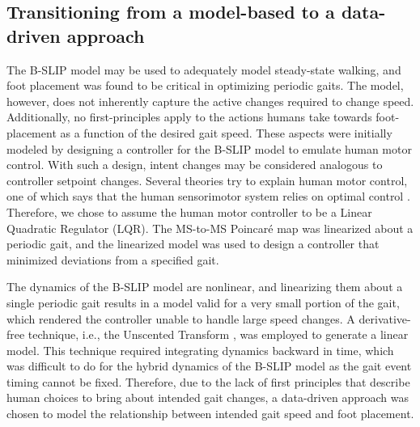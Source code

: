 \subsection{Transitioning from a model-based to a data-driven approach}
The B-SLIP model may be used to adequately model steady-state walking, and foot placement was found to be critical in optimizing periodic gaits. The model, however, does not inherently capture the active changes required to change speed. Additionally, no first-principles apply to the actions humans take towards foot-placement as a function of the desired gait speed. These aspects were initially modeled by designing a controller for the B-SLIP model to emulate human motor control. With such a design, intent changes may be considered analogous to controller setpoint changes. Several theories try to explain human motor control, one of which says that the human sensorimotor system relies on optimal control \cite{todorov2004optimality,sylla2014assessing}. Therefore, we chose to assume the human motor controller to be a Linear Quadratic Regulator (LQR). The MS-to-MS Poincar\'e map was linearized about a periodic gait, and the linearized model was used to design a controller that minimized deviations from a specified gait. 

The dynamics of the B-SLIP model are nonlinear, and linearizing them about a single periodic gait results in a model valid for a very small portion of the gait, which rendered the controller unable to handle large speed changes. A derivative-free technique, i.e., the Unscented Transform \cite{manchester2016derivative}, was employed to generate a linear model. This technique required integrating dynamics backward in time, which was difficult to do for the hybrid dynamics of the B-SLIP model as the gait event timing cannot be fixed. Therefore, due to the lack of first principles that describe human choices to bring about intended gait changes, a data-driven approach was chosen to model the relationship between intended gait speed and foot placement.

